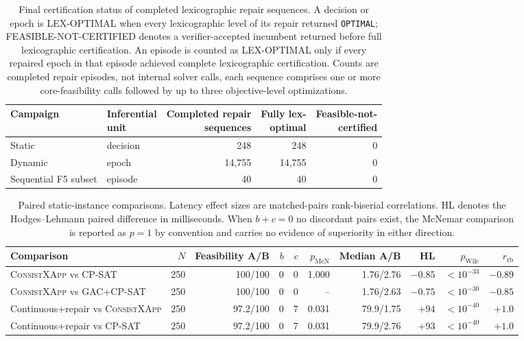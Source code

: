 \documentclass[pdflatex,sn-mathphys-num,iicol,oneside]{sn-jnl}
\newcommand{\method}{\textsc{ConsistXApp}\xspace}
\newcommand{\gac}{\textsc{GAC}\xspace}
\newcommand{\cpsat}{\textsc{CP-SAT}\xspace}
\begin{document}
\begin{table}[t]
\centering
\caption{
Final certification status of completed lexicographic repair
sequences. A decision or epoch is LEX-OPTIMAL when every
lexicographic level of its repair returned \texttt{OPTIMAL};
FEASIBLE-NOT-CERTIFIED denotes a verifier-accepted incumbent
returned before full lexicographic certification. An episode is
counted as LEX-OPTIMAL only if every repaired epoch in that episode
achieved complete lexicographic certification. Counts are completed
repair episodes, not internal solver calls, each sequence comprises
one or more core-feasibility calls followed by up to three
objective-level optimizations.
}
\label{tab:epoch-status}
\setlength{\tabcolsep}{4pt}
\small
\begin{tabular}{llrrr}
\toprule
Campaign & \shortstack[l]{Inferential\\unit} & \shortstack[l]{Completed repair\\sequences} & \shortstack[l]{Fully lex-\\optimal} & \shortstack[l]{Feasible-not-\\certified} \\
\midrule
Static & decision & 248 & 248 & 0 \\
Dynamic & epoch & 14{,}755 & 14{,}755 & 0 \\
Sequential F5 subset & episode & 40 & 40 & 0 \\
\bottomrule
\end{tabular}
\end{table}

\begin{table}[t]
\centering
\caption{
Paired static-instance comparisons. Latency effect sizes are
matched-pairs rank-biserial correlations. HL denotes the
Hodges--Lehmann paired difference in milliseconds. When $b+c=0$ no
discordant pairs exist, the McNemar comparison is reported as
$p=1$ by convention and carries no evidence of superiority in either
direction.
}
\label{tab:stats-paired}
\setlength{\tabcolsep}{3pt}
\small

\begin{tabular}{lrrrrrrrrr}
\toprule
Comparison &
$N$ &
Feasibility A/B &
$b$ & $c$ &
$p_{\mathrm{McN}}$ &
Median A/B &
HL &
$p_{\mathrm{Wilc}}$ &
$r_{\mathrm{rb}}$\\
\midrule

\method vs \cpsat
& 250 & 100/100 & 0 & 0 & 1.000 & 1.76/2.76 &
$-0.85$ & $<10^{-33}$ & $-0.89$\\

\method vs \gac+\cpsat
& 250 & 100/100 & 0 & 0 & -- & 1.76/2.63 &
$-0.75$ & $<10^{-30}$ & $-0.85$\\

Continuous+repair vs \method
& 250 & 97.2/100 & 0 & 7 & 0.031 & 79.9/1.75 &
$+94$ & $<10^{-40}$ & $+1.0$\\

Continuous+repair vs \cpsat
& 250 & 97.2/100 & 0 & 7 & 0.031 & 79.9/2.76 &
$+93$ & $<10^{-40}$ & $+1.0$\\

\bottomrule
\end{tabular}
\normalsize
\end{table}
\end{document}
